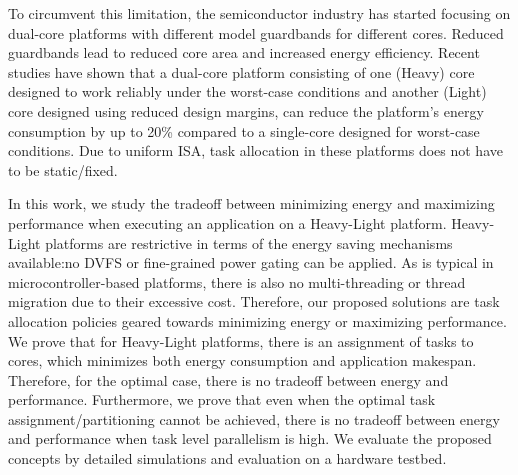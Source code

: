 To circumvent this limitation, the semiconductor industry has started focusing on dual-core platforms with different model guardbands for different cores. Reduced guardbands lead to reduced core area and increased energy efficiency. %
Recent studies have shown that a dual-core platform consisting of one (Heavy) core designed to work reliably under the worst-case conditions and another (Light) core designed using reduced design margins, can reduce the platform's energy consumption by up to 20\% compared to a single-core designed for worst-case conditions\cite{Gomez1}. Due to uniform ISA, task allocation in these platforms does not have to be static/fixed. 

In this work, we study the tradeoff between minimizing energy and maximizing performance when executing an application on a Heavy-Light platform. Heavy-Light platforms are restrictive in terms of the energy saving mechanisms available:no DVFS or fine-grained power gating can be applied. %
As is typical in microcontroller-based platforms, there is also no multi-threading or thread migration due to their excessive cost. Therefore, our proposed solutions are task allocation policies geared towards minimizing energy or maximizing performance. We prove that for Heavy-Light platforms, there is an assignment of tasks to cores, which minimizes both energy consumption and application makespan. Therefore, for the optimal case, there is no tradeoff between energy and performance. Furthermore, we prove that even when the optimal task assignment/partitioning cannot be achieved, there is no tradeoff between energy and performance when task level parallelism is high. We evaluate the proposed concepts by detailed simulations and evaluation on a hardware testbed.  




